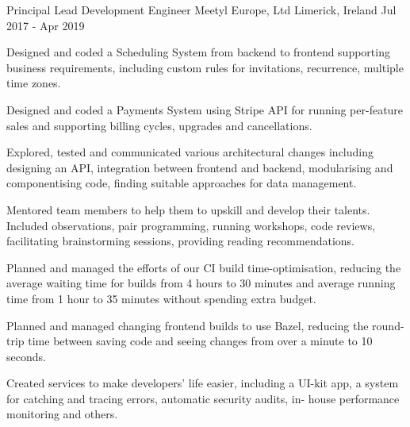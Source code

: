 


\begin{cventries}

  \cventry
    {Principal Lead Development Engineer} %
    {Meetyl Europe, Ltd} %
    {Limerick, Ireland} %
    {Jul 2017 - Apr 2019} %
    {
      \begin{cvitems} %
        \item {Designed and coded a Scheduling System from backend to frontend supporting business requirements, including custom rules for invitations, recurrence, multiple time zones.}
        \item {Designed and coded a Payments System using Stripe API for running per-feature sales and supporting billing cycles, upgrades and cancellations.}
        \item {Explored, tested and communicated various architectural changes including designing an API, integration between frontend and backend, modularising and componentising code, finding suitable approaches for data management.}
        \item {Mentored team members to help them to upskill and develop their talents. Included observations, pair programming, running workshops, code reviews, facilitating brainstorming sessions, providing reading recommendations.}
        \item {Planned and managed the efforts of our CI build time-optimisation, reducing the average waiting time for builds from 4 hours to 30 minutes and average running time from 1 hour to 35 minutes without spending extra budget.}
        \item {Planned and managed changing frontend builds to use Bazel, reducing the round-trip time between saving code and seeing changes from over a minute to 10 seconds.}
        \item {Created services to make developers’ life easier, including a UI-kit app, a system for catching and tracing errors, automatic security audits, in- house performance monitoring and others.}
      \end{cvitems}
    }


\end{cventries}

